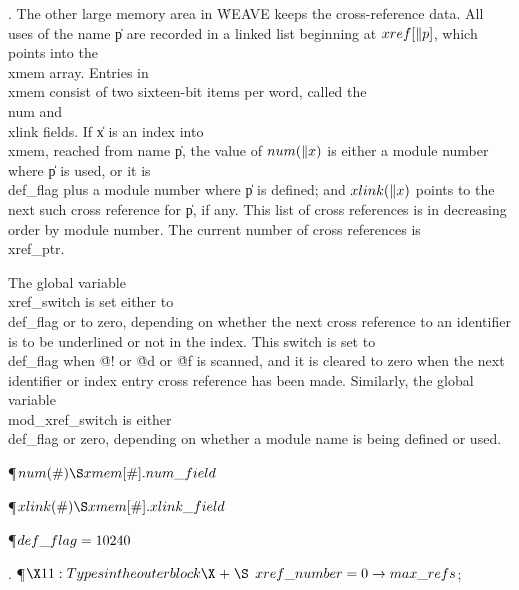. The other large memory area in \.{WEAVE} keeps the cross-reference data.
All uses of the name \|p are recorded in a linked list beginning at
$\\{xref}[\|p]$, which points into the \\{xmem} array. Entries in \\{xmem}
consist
of two sixteen-bit items per word, called the \\{num} and \\{xlink} fields.
If \|x is an index into \\{xmem}, reached from name \|p, the value of $\\{num}(%
\|x)$
is either a module number where \|p is used, or it is \\{def\_flag} plus a
module number where \|p is defined; and $\\{xlink}(\|x)$ points to the next
such
cross reference for \|p, if any. This list of cross references is in
decreasing order by module number. The current number of cross references
is \\{xref\_ptr}.

The global variable \\{xref\_switch} is set either to \\{def\_flag} or to zero,
depending on whether the next cross reference to an identifier is to be
underlined or not in the index. This switch is set to \\{def\_flag} when
\.{@!} or \.{@d} or \.{@f} is scanned, and it is cleared to zero when
the next identifier or index entry cross reference has been made. Similarly,
the global variable \\{mod\_xref\_switch} is either \\{def\_flag} or zero,
depending
on whether a module name is being defined or used.

\Y\P\D {}$\\{num}(\#)\S\\{xmem}[\#].\\{num\_field}$\par
\P\D {}$\\{xlink}(\#)\S\\{xmem}[\#].\\{xlink\_field}$\par
\P\D {}$\\{def\_flag}=10240$%
\par
\fi

. \P$\X11:Types in the outer block\X\mathrel{+}\S$\6
$\\{xref\_number}=0\to\\{max\_refs}$;\par
\fi


